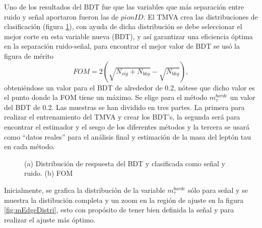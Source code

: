 Uno de los resultados del BDT fue que las variables que más separación entre ruido y señal aportaron fueron las de \(pionID\). El TMVA crea las distribuciones de clasificación (figura \ref{fig:bdtFom}), con ayuda de dicha distribución se debe seleccionar el mejor corte en esta variable nueva (BDT), y así garantizar una eficiencia óptima en la separación ruido-señal, para encontrar el mejor valor de BDT se usó la figura de mérito
\begin{equation}
    FOM=2\left(\sqrt{N_{sig}+N_{bkg}}-\sqrt{N_{bkg}}\right)\label{fom},
\end{equation}
obteniéndose un valor para el BDT de alrededor de 0.2, nótese que dicho valor es el punto donde la FOM tiene un máximo. Se elige para el método \(m^{borde}_{\tau}\) un valor del BDT de 0.2. Las muestras se han dividido en tres partes. La primera para realizar el entrenamiento del TMVA y crear los BDT's, la segunda será para encontrar el estimador y el sesgo de los diferentes métodos y la tercera se usará como ``datos reales'' para el análisis final y estimación de la masa del leptón tau en cada método.
\begin{figure}%
    \centering
    \qquad
    \caption{(a) Distribución de respuesta del BDT y clasificada como señal y ruido. (b) FOM}
    \label{fig:bdtFom}%
\end{figure}
Inicialmente, se grafica la distribución de la variable \(m^{borde}_{\tau}\) sólo para señal y se muestra la distibución completa y un zoom en la región de ajuste en la figura \ref{fig:mEdgeDistri}, esto con propósito de tener bien definida la señal y para realizar el ajuste más óptimo. 

